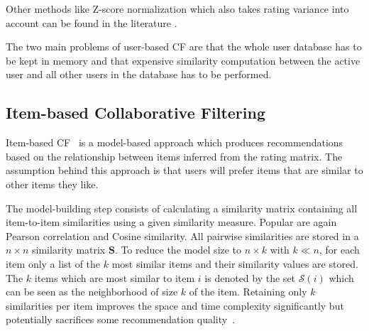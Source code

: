 \documentclass[nojss]{jss}
\newcommand{\set}[1]{\mathcal{#1}}
\newcommand{\mat}[1]{{\mathbf{#1}}}
\begin{document}
Other methods like Z-score normalization which also takes rating variance
into account can be found in the
literature \citep[see, e.g.,][]{recommender:Desrosiers:2011}.


The two main problems of user-based CF are that the whole
user database has to be kept in memory and that
expensive similarity computation between the active user and
all other users in the database has to be performed.


\subsection{Item-based Collaborative Filtering}
Item-based CF~\citep{Kitts:2000,recommender:Sarwar:2001,
recommender:Linden:2003,recommender:Deshpande:2004}
is a model-based approach which produces recommendations
based on the relationship between items inferred from the rating
matrix. The assumption behind this approach is that users will prefer items
that are similar to other items they like.

The model-building step consists of calculating a similarity matrix
containing all item-to-item similarities using a given similarity measure.
Popular are again Pearson correlation and Cosine similarity.
%
All pairwise similarities are stored in a $n \times n$
similarity matrix $\mat{S}$.
To reduce the model size
to $n \times k$ with $k \ll n$,
for each item only a list of the $k$ most similar
items and their similarity values are stored.
The $k$ items which are most similar to item $i$ is
denoted by the set $\set{S}(i)$ which can be seen as the
neighborhood of size $k$ of the item.
Retaining only $k$ similarities per item improves the
space and time complexity significantly but potentially sacrifices
some recommendation quality~\citep{recommender:Sarwar:2001}.
\end{document}
